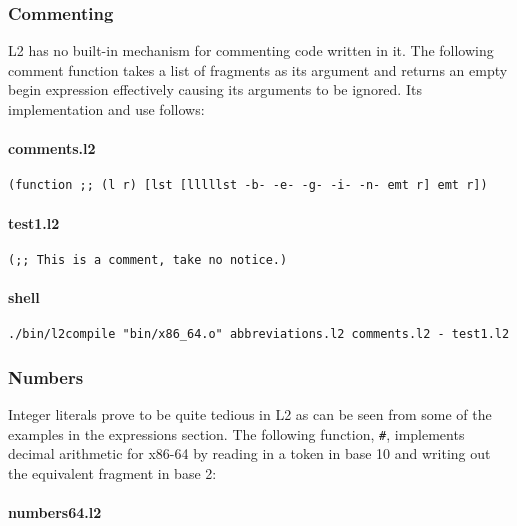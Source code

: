\documentclass[]{article}
\let\oldparagraph\paragraph
\renewcommand{\paragraph}[1]{\oldparagraph{#1}\mbox{}}
\begin{document}
\hypertarget{commenting}{\subsubsection{Commenting}\label{commenting}}

L2 has no built-in mechanism for commenting code written in it. The
following comment function takes a list of fragments as its argument and
returns an empty begin expression effectively causing its arguments to
be ignored. Its implementation and use follows:

\paragraph{comments.l2}\label{comments.l2}

\begin{verbatim}
(function ;; (l r) [lst [lllllst -b- -e- -g- -i- -n- emt r] emt r])
\end{verbatim}

\paragraph{test1.l2}\label{test1.l2}

\begin{verbatim}
(;; This is a comment, take no notice.)
\end{verbatim}

\paragraph{shell}\label{shell}

\begin{verbatim}
./bin/l2compile "bin/x86_64.o" abbreviations.l2 comments.l2 - test1.l2
\end{verbatim}

\hypertarget{numbers}{\subsubsection{Numbers}\label{numbers}}

Integer literals prove to be quite tedious in L2 as can be seen from
some of the examples in the expressions section. The following function,
\texttt{\#}, implements decimal arithmetic for x86-64 by reading in a
token in base 10 and writing out the equivalent fragment in base 2:

\paragraph{numbers64.l2}\label{numbers64.l2}
\end{document}
